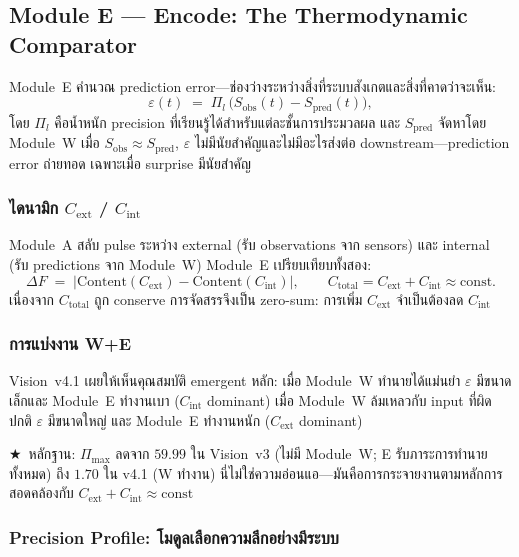 \documentclass[12pt,a4paper]{article}
\newcommand{\Cext}{C_{\mathrm{ext}}}
\newcommand{\Cint}{C_{\mathrm{int}}}
\newcommand{\Sobs}{S_{\mathrm{obs}}}
\newcommand{\Spred}{S_{\mathrm{pred}}}
\newcommand{\starred}{\textbf{\textcolor{pbtblue}{$\bigstar$}}~}
\begin{document}
\subsection{Module E --- Encode: The Thermodynamic Comparator}

Module~E คำนวณ prediction error---ช่องว่างระหว่างสิ่งที่ระบบสังเกตและสิ่งที่คาดว่าจะเห็น:
\begin{equation}
  \varepsilon(t) \;=\; \Pi_l\,\bigl(\Sobs(t) - \Spred(t)\bigr),
  \label{eq:epsilon}
\end{equation}
โดย $\Pi_l$ คือน้ำหนัก precision ที่เรียนรู้ได้สำหรับแต่ละชั้นการประมวลผล
และ $\Spred$ จัดหาโดย Module~W เมื่อ $\Sobs\approx\Spred$, $\varepsilon$
ไม่มีนัยสำคัญและไม่มีอะไรส่งต่อ downstream---prediction error ถ่ายทอด
เฉพาะเมื่อ surprise มีนัยสำคัญ

\subsubsection{ไดนามิก $\Cext$ / $\Cint$}

Module~A สลับ pulse ระหว่าง external (รับ observations จาก sensors)
และ internal (รับ predictions จาก Module~W) Module~E เปรียบเทียบทั้งสอง:
\begin{equation}
  \Delta F \;=\; \bigl|\mathrm{Content}(\Cext) - \mathrm{Content}(\Cint)\bigr|,
  \qquad C_{\mathrm{total}} = \Cext + \Cint \approx \mathrm{const}.
  \label{eq:Csplit}
\end{equation}
เนื่องจาก $C_{\mathrm{total}}$ ถูก conserve การจัดสรรจึงเป็น zero-sum:
การเพิ่ม $\Cext$ จำเป็นต้องลด $\Cint$

\subsubsection{การแบ่งงาน W+E}

Vision~v4.1 เผยให้เห็นคุณสมบัติ emergent หลัก: เมื่อ Module~W ทำนายได้แม่นยำ
$\varepsilon$ มีขนาดเล็กและ Module~E ทำงานเบา ($\Cint$ dominant)
เมื่อ Module~W ล้มเหลวกับ input ที่ผิดปกติ $\varepsilon$ มีขนาดใหญ่
และ Module~E ทำงานหนัก ($\Cext$ dominant)

\starred หลักฐาน: $\Pi_{\max}$ ลดจาก $59.99$ ใน Vision~v3 (ไม่มี Module~W;
E รับภาระการทำนายทั้งหมด) ถึง $1.70$ ใน v4.1 (W ทำงาน)
นี่ไม่ใช่ความอ่อนแอ---มันคือการกระจายงานตามหลักการสอดคล้องกับ
$\Cext + \Cint \approx\mathrm{const}$

\subsubsection{Precision Profile: โมดูลเลือกความลึกอย่างมีระบบ}
\end{document}
